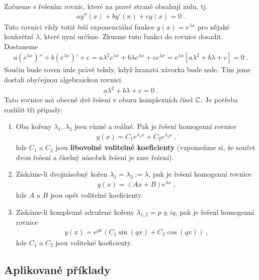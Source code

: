 Začneme s řešením rovnic, které na pravé straně obsahují nulu, tj. \begin{align}
    a y''(x) + b y'(x) + c y(x) = 0 \:.
\end{align}
Tuto rovnici vždy totiž řeší exponenciální funkce $y(x) = e^{\lambda x}$ pro nějaké konkrétní $\lambda$, které nyní určíme. Zkusme tuto funkci do rovnice dosadit. Dostaneme
\begin{align}
    a (e^{\lambda x})'' + b (e^{\lambda x})' + c = a \lambda^2  e^{\lambda x} + b \lambda e^{\lambda x} + c e^{\lambda x} = e^{\lambda x} [a \lambda^2 + b \lambda + c ] = 0 \:.
\end{align}
Součin bude roven nule právě tehdy, když hranatá závorka bude nule. Tím jsme dostali obyčejnou algebraickou rovnici \begin{align}
    a \lambda^2 + b \lambda + c = 0 \:.
\end{align}
Tato rovnice má obecně dvě řešení v oboru komplexních čísel $\mathbb{C}$. Je potřeba rozlišit tři případy:
\begin{enumerate}
    \item Oba kořeny $\lambda_1$, $\lambda_2$ jsou různé a reálné. Pak je řešení homogenní rovnice \begin{align}
        y(x) = C_1 e^{\lambda_1 x} + C_2 e^{\lambda_2 x} \:,
    \end{align}
    kde $C_1$ a $C_2$ jsou \textbf{libovolné volitelné koeficienty} (vzpomeňme si, že součet dvou řešení a číselný násobek řešení je zase řešení).

    \item Získáme-li dvojnásobný kořen $\lambda_1 = \lambda_2 := \lambda $, pak je řešení homogenní rovnice \begin{align}
        y(x) = (Ax + B) e^{\lambda x } \:,
    \end{align}
    kde $A$ a $B$ jsou opět volitelné koeficienty.

    \item Získáme-li komplexně sdružené kořeny $\lambda_{1,2} = p \pm i q$, pak je řešení homogenní rovnice \begin{align}
        y(x) = e^{px} \left( C_1 \sin (q x) + C_2 \cos(qx) \right) \:,
    \end{align}
    kde $C_1$ a $C_2$ jsou volitelné koeficienty.
\end{enumerate}

\subsection{Aplikované příklady}

